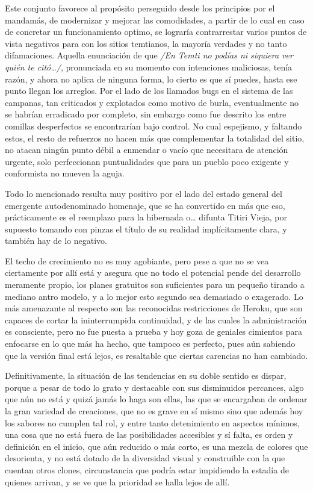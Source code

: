 \documentclass[
]{book}
\begin{document}
Este conjunto favorece al propósito perseguido desde los principios por el mandamás, de modernizar y mejorar las comodidades, a partir de lo cual en caso de concretar un funcionamiento optimo, se lograría contrarrestar varios puntos de vista negativos para con los sitios temtianos, la mayoría verdades y no tanto difamaciones. Aquella enunciación de que \emph{/En Temti no podías ni siquiera ver quién te citó\ldots/}, pronunciada en su momento con intenciones maliciosas, tenía razón, y ahora no aplica de ninguna forma, lo cierto es que sí puedes, hasta ese punto llegan los arreglos. Por el lado de los llamados bugs en el sistema de las campanas, tan criticados y explotados como motivo de burla, eventualmente no se habrían erradicado por completo, sin embargo como fue descrito los entre comillas desperfectos se encontrarían bajo control. No cual espejismo, y faltando estos, el resto de refuerzos no hacen más que complementar la totalidad del sitio, no atacan ningún punto débil a enmendar o vacío que necesitara de atención urgente, solo perfeccionan puntualidades que para un pueblo poco exigente y conformista no mueven la aguja.

Todo lo mencionado resulta muy positivo por el lado del estado general del emergente autodenominado homenaje, que se ha convertido en más que eso, prácticamente es el reemplazo para la hibernada o\ldots{} difunta Titiri Vieja, por supuesto tomando con pinzas el título de su realidad implícitamente clara, y también hay de lo negativo.

El techo de crecimiento no es muy agobiante, pero pese a que no se vea ciertamente por allí está y asegura que no todo el potencial pende del desarrollo meramente propio, los planes gratuitos son suficientes para un pequeño tirando a mediano antro modelo, y a lo mejor esto segundo sea demasiado o exagerado. Lo más amenazante al respecto son las reconocidas restricciones de Heroku, que son capaces de cortar la ininterrumpida continuidad, y de las cuales la administración es consciente, pero no fue puesta a prueba y hoy goza de geniales cimientos para enfocarse en lo que más ha hecho, que tampoco es perfecto, pues aún sabiendo que la versión final está lejos, es resaltable que ciertas carencias no han cambiado.

Definitivamente, la situación de las tendencias en su doble sentido es dispar, porque a pesar de todo lo grato y destacable con sus disminuidos percances, algo que aún no está y quizá jamás lo haga son ellas, las que se encargaban de ordenar la gran variedad de creaciones, que no es grave en sí mismo sino que además hoy los sabores no cumplen tal rol, y entre tanto detenimiento en aspectos mínimos, una cosa que no está fuera de las posibilidades accesibles y sí falta, es orden y definición en el inicio, que aún reducido o más corto, es una mezcla de colores que desorienta, y no está dotado de la diversidad visual y construible con la que cuentan otros clones, circunstancia que podría estar impidiendo la estadía de quienes arrivan, y se ve que la prioridad se halla lejos de allí.
\end{document}

